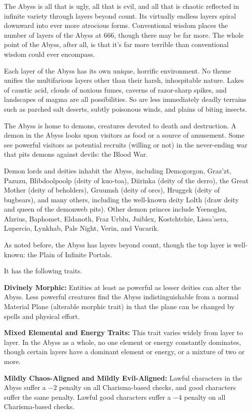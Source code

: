 The Abyss is all that is ugly, all that is evil, and all that is chaotic reflected in infinite variety through layers beyond count. Its virtually endless layers spiral downward into ever more atrocious forms. Conventional wisdom places the number of layers of the Abyss at 666, though there may be far more. The whole point of the Abyss, after all, is that it's far more terrible than conventional wisdom could ever encompass.

Each layer of the Abyss has its own unique, horrific environment. No theme unifies the multifarious layers other than their harsh, inhospitable nature. Lakes of caustic acid, clouds of noxious fumes, caverns of razor-sharp spikes, and landscapes of magma are all possibilities. So are less immediately deadly terrains such as parched salt deserts, subtly poisonous winds, and plains of biting insects.

The Abyss is home to demons, creatures devoted to death and destruction. A demon in the Abyss looks upon visitors as food or a source of amusement. Some see powerful visitors as potential recruits (willing or not) in the never-ending war that pits demons against devils: the Blood War.

Demon lords and deities inhabit the Abyss, including Demogorgon, Graz'zt, Pazuzu, Blibdoolpoolp (deity of kuo-toa), Diirinka (deity of the derro), the Great Mother (deity of beholders), Gruumsh (deity of orcs), Hruggek (deity of bugbears), and many others, including the well-known deity Lolth (draw deity and queen of the demonweb pits). Other demon princes include Yeenoghu, Alzrius, Baphomet, Eldanoth, Fraz Urblu, Juiblex, Kostchtchie, Lissa'aera, Lupercio, Lynkhab, Pale Night, Verin, and Vucarik.

As noted before, the Abyss has layers beyond count, though the top layer is well-known: the Plain of Infinite Portals.

It has the following traits.
\begin{itemize*}
\item \textbf{Divinely Morphic:} Entities at least as powerful as lesser deities can alter the Abyss. Less powerful creatures find the Abyss indistinguishable from a normal Material Plane (alterable morphic trait) in that the plane can be changed by spells and physical effort.
\item \textbf{Mixed Elemental and Energy Traits:} This trait varies widely from layer to layer. In the Abyss as a whole, no one element or energy constantly dominates, though certain layers have a dominant element or energy, or a mixture of two or more.
\item \textbf{Mildly Chaos-Aligned and Mildly Evil-Aligned:} Lawful characters in the Abyss suffer a $-2$ penalty on all Charisma-based checks, and good characters suffer the same penalty. Lawful good characters suffer a $-4$ penalty on all Charisma-based checks.
\end{itemize*}

